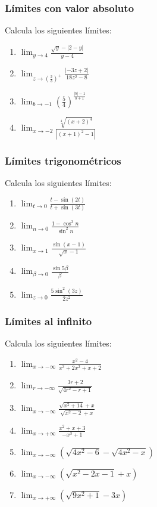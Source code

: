 \documentclass[12pt]{article}
\begin{document}
\subsubsection{Límites con valor absoluto}


Calcula los siguientes límites:
\begin{enumerate}
    \item $\displaystyle \lim_{y \to 4} \frac{\sqrt{y} - |2 - y|}{y - 4}$
    \item $\displaystyle \lim_{z \to \left(\frac{2}{3}\right)^+} \frac{|-3z + 2|}{18z^2 - 8}$
    \item $\displaystyle \lim_{b \to -1} \left(\frac{5}{4}\right)^{\frac{|b| - 1}{b + 1}}$
    \item $\displaystyle \lim_{x \to -2} \frac{\sqrt[4]{(x + 2)^4}}{|(x + 1)^2 - 1|}$
\end{enumerate}



\subsubsection{Límites trigonométricos}


Calcula los siguientes límites:
\begin{enumerate}
    \item $\displaystyle \lim_{t \to 0} \frac{t - \sin(2t)}{t + \sin(3t)}$
    \item $\displaystyle \lim_{n \to 0} \frac{1 - \cos^3 n}{\sin^2 n}$
    \item $\displaystyle \lim_{x \to 1} \frac{\sin(x - 1)}{\sqrt{x} - 1}$
    \item $\displaystyle \lim_{\beta \to 0} \frac{\sin 5\beta}{\beta}$
    \item $\displaystyle \lim_{z \to 0} \frac{5\sin^2(3z)}{2z^2}$
\end{enumerate}



\subsubsection{Límites al infinito}


Calcula los siguientes límites:
\begin{enumerate}
    \item $\displaystyle \lim_{x \to -\infty} \frac{x^2 - 4}{x^3 + 2x^2 + x + 2}$
    \item $\displaystyle \lim_{r \to -\infty} \frac{3r + 2}{\sqrt{4r^2 - r + 1}}$
    \item $\displaystyle \lim_{x \to -\infty} \frac{\sqrt{x^2 + 14} + x}{\sqrt{x^2 - 2} + x}$
    \item $\displaystyle \lim_{x \to +\infty} \frac{x^2 + x + 3}{-x^3 + 1}$
    \item $\displaystyle \lim_{x \to -\infty} \left(\sqrt{4x^2 - 6} - \sqrt{4x^2 - x}\right)$
    \item $\displaystyle \lim_{x \to -\infty} \left(\sqrt{x^2 - 2x - 1} + x\right)$
    \item $\displaystyle \lim_{x \to +\infty} \left(\sqrt{9x^2 + 1} - 3x\right)$
\end{enumerate}
\end{document}
